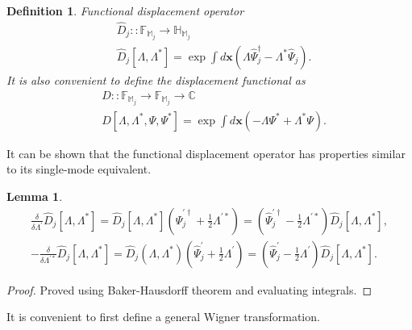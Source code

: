 \documentclass[12pt,aip,jmp,amssymb,amsmath]{revtex4-1}
\newcommand{\xvec}{\boldsymbol{x}}
\newcommand{\Psiop}{\hat{\Psi}}
\newcommand{\restbasis}{\mathbb{M}}
\newtheorem{definition}{Definition}
\newtheorem{lemma}{Lemma}
\begin{document}
\begin{definition}
    Functional displacement operator
    \begin{equation*}\begin{split}
        & \hat{D}_j :: \mathbb{F}_{\restbasis_j} \rightarrow \mathbb{H}_{\restbasis_j} \\
        & \hat{D}_j[\Lambda, \Lambda^*] = \exp \int d\xvec \left(
            \Lambda \Psiop_j^\dagger - \Lambda^* \Psiop_j
        \right).
    \end{split}\end{equation*}
    It is also convenient to define the displacement functional as
    \begin{equation*}\begin{split}
        & D :: \mathbb{F}_{\restbasis_j} \rightarrow \mathbb{F}_{\restbasis_j} \rightarrow \mathbb{C} \\
        & D[\Lambda, \Lambda^*, \Psi, \Psi^*] = \exp \int d\xvec \left(
            -\Lambda \Psi^* + \Lambda^* \Psi
        \right).
    \end{split}\end{equation*}
\end{definition}

It can be shown that the functional displacement operator has properties similar to its single-mode equivalent.

\begin{lemma}
\label{lmm:func-wigner:displacement-derivatives}
    \begin{equation*}\begin{split}
        \frac{\delta}{\delta \Lambda^\prime} \hat{D}_j[\Lambda, \Lambda^*]
        = \hat{D}_j[\Lambda, \Lambda^*] (\Psiop_j^{\prime\dagger} + \frac{1}{2} \Lambda^{\prime*})
        = (\Psiop_j^{\prime\dagger} - \frac{1}{2} \Lambda^{\prime*}) \hat{D}_j[\Lambda, \Lambda^*], \\
        -\frac{\delta}{\delta \Lambda^{\prime*}} \hat{D}_j[\Lambda, \Lambda^*]
        = \hat{D}_j(\Lambda, \Lambda^*) (\Psiop_j^\prime + \frac{1}{2} \Lambda^\prime)
        = (\Psiop_j^\prime - \frac{1}{2} \Lambda^\prime) \hat{D}_j[\Lambda, \Lambda^*].
    \end{split}\end{equation*}
\end{lemma}
\begin{proof}
Proved using Baker-Hausdorff theorem and evaluating integrals.
\end{proof}

It is convenient to first define a general Wigner transformation.
\end{document}
